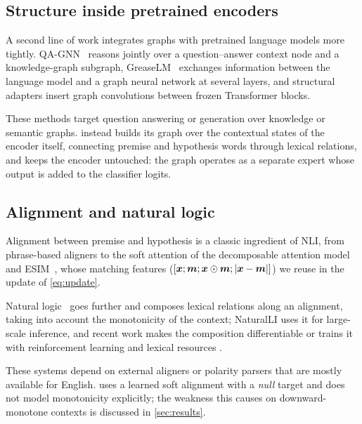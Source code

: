 \subsection{Structure inside pretrained encoders}
\label{sec:rw-structure}

A second line of work integrates graphs with pretrained language models more tightly.
QA-GNN~\citep{yasunaga2021qagnn} reasons jointly over a question--answer context node and a
knowledge-graph subgraph, GreaseLM~\citep{zhang2022greaselm} exchanges information between the
language model and a graph neural network at several layers, and structural adapters
\citep{ribeiro2021structadapt} insert graph convolutions between frozen Transformer blocks.

These methods
target question answering or generation over knowledge or semantic graphs. \model{} instead builds its
graph over the contextual states of the encoder itself, connecting premise and hypothesis words through
lexical relations, and keeps the encoder untouched: the graph operates as a separate expert whose output
is added to the classifier logits.

\subsection{Alignment and natural logic}
\label{sec:rw-alignment}

Alignment between premise and hypothesis is a classic ingredient of NLI, from phrase-based aligners
\citep{maccartney2008phrase} to the soft attention of the decomposable attention model
\citep{parikh2016decomposable} and ESIM~\citep{chen2017enhanced}, whose matching features
($[\bm{x};\bm{m};\bm{x}\odot\bm{m};|\bm{x}-\bm{m}|]$) we reuse in the update of
\cref{eq:update}.

Natural logic~\citep{maccartney2009extended} goes further and composes lexical
relations along an alignment, taking into account the monotonicity of the context; NaturalLI
\citep{angeli2014naturalli} uses it for large-scale inference, and recent work makes the composition
differentiable \citep{feng2020exploring} or trains it with reinforcement learning and lexical resources
\citep{feng2022neuro}.

These systems depend on external aligners or polarity parsers that are mostly
available for English. \model{} uses a learned soft alignment with a \emph{null} target and does not model
monotonicity explicitly; the weakness this causes on downward-monotone contexts is discussed in
\cref{sec:results}.

